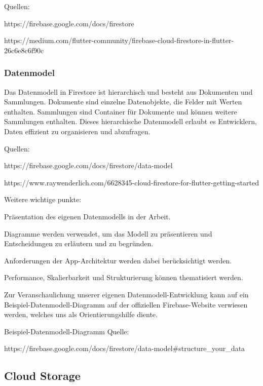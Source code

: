 Quellen:

https://firebase.google.com/docs/firestore

https://medium.com/flutter-community/firebase-cloud-firestore-in-flutter-26c6e8c6f90c

\subsubsection{Datenmodel}

Das Datenmodell in Firestore ist hierarchisch und besteht aus Dokumenten und Sammlungen. Dokumente sind einzelne Datenobjekte, die Felder mit Werten enthalten. Sammlungen sind Container für Dokumente und können weitere Sammlungen enthalten. Dieses hierarchische Datenmodell erlaubt es Entwicklern, Daten effizient zu organisieren und abzufragen.


Quellen:

https://firebase.google.com/docs/firestore/data-model

https://www.raywenderlich.com/6628345-cloud-firestore-for-flutter-getting-started

Weitere wichtige punkte:

\begin{compactitem}
    \item Präsentation des eigenen Datenmodells in der Arbeit.
    \item Diagramme werden verwendet, um das Modell zu präsentieren und Entscheidungen zu erläutern und zu begründen.
    \item Anforderungen der App-Architektur werden dabei berücksichtigt werden.
    \item Performance, Skalierbarkeit und Strukturierung können thematisiert werden.
    \item Zur Veranschaulichung unserer eigenen Datenmodell-Entwicklung kann auf ein Beispiel-Datenmodell-Diagramm auf der offiziellen Firebase-Website verwiesen werden, welches uns als Orientierungshilfe diente.
\end{compactitem}

Beispiel-Datenmodell-Diagramm Quelle:

https://firebase.google.com/docs/firestore/data-model\#structure\_your\_data

\subsection{Cloud Storage}

